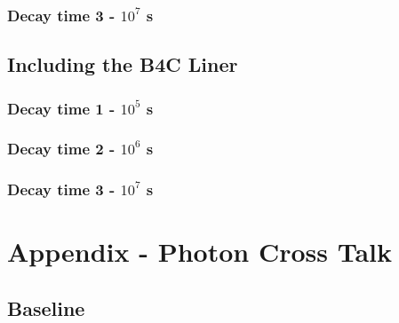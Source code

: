 \documentclass[12pt]{article}
\begin{document}
\subsubsection{Decay time 3 - $10^7$ s}

\clearpage
\subsection{Including the B4C Liner}
\subsubsection{Decay time 1 - $10^5$ s}

\clearpage
\subsubsection{Decay time 2 - $10^6$ s}

\clearpage
\subsubsection{Decay time 3 - $10^7$ s}


\newpage
\clearpage
\section{Appendix - Photon Cross Talk}
\label{cross_talk_data}
\subsection{Baseline}
\end{document}
